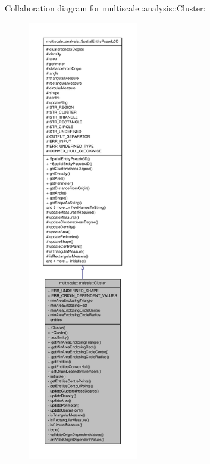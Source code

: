 \-Collaboration diagram for multiscale\-:\-:analysis\-:\-:\-Cluster\-:\nopagebreak
\begin{figure}[H]
\begin{center}
\leavevmode
\includegraphics[height=550pt]{classmultiscale_1_1analysis_1_1Cluster__coll__graph}
\end{center}
\end{figure}
